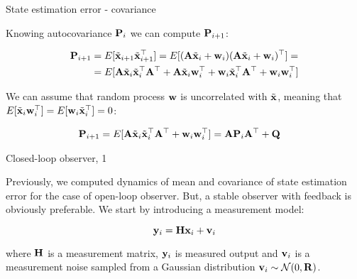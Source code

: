 \documentclass{beamer}
\begin{document}
\begin{frame}{State estimation error - covariance}
	\begin{flushleft}
		
		Knowing autocovariance $\mathbf{P}_i$ we can compute $\mathbf{P}_{i+1}$:
		
		\begin{align*}
			\mathbf{P}_{i+1} &= E[\Tilde{\mathbf{x}}_{i+1}\Tilde{\mathbf{x}}_{i+1}^\top] = 
			E[(\mathbf{A} \Tilde{\mathbf{x}}_i + \mathbf{w}_i) (\mathbf{A} \Tilde{\mathbf{x}}_i + \mathbf{w}_i)^\top] = 
			\\
			&=
			E[\mathbf{A} \Tilde{\mathbf{x}}_i \Tilde{\mathbf{x}}_i^\top \mathbf{A}^\top +
			\mathbf{A} \Tilde{\mathbf{x}}_i \mathbf{w}_i^\top + 
			\mathbf{w}_i \Tilde{\mathbf{x}}_i^\top \mathbf{A}^\top +
			\mathbf{w}_i \mathbf{w}_i^\top]
		\end{align*}
		
		We can assume that random process $\mathbf{w}$ is uncorrelated with $\Tilde{\mathbf{x}}$, meaning that $E[\Tilde{\mathbf{x}}_i \mathbf{w}_i^\top] = E[\mathbf{w}_i \Tilde{\mathbf{x}}_i^\top] = 0$:
		
		\begin{align*}
			\mathbf{P}_{i+1} 
			&=
			E[\mathbf{A} \Tilde{\mathbf{x}}_i \Tilde{\mathbf{x}}_i^\top \mathbf{A}^\top +
			\mathbf{w}_i \mathbf{w}_i^\top] 
			= 
			\mathbf{A} \mathbf{P}_i \mathbf{A}^\top +
			\mathbf{Q}
		\end{align*}
		
		
	\end{flushleft}
\end{frame}



\begin{frame}{Closed-loop observer, 1}
	\begin{flushleft}
		
		Previously, we computed dynamics of mean and covariance of state estimation error for the case of open-loop observer. But, a stable observer with feedback is obviously preferable. We start by introducing a measurement model:
		
		\begin{equation}
			\mathbf{y}_i = \mathbf{H} \mathbf{x}_i + \mathbf{v}_i
		\end{equation}
		
		where $\mathbf{H}$ is a measurement matrix, $\mathbf{y}_i$ is measured output and $\mathbf{v}_i$ is a measurement noise sampled from a Gaussian distribution $\mathbf{v}_i \sim \mathcal{N} (0, \mathbf{R})$.
		
	\end{flushleft}
\end{frame}
\end{document}
